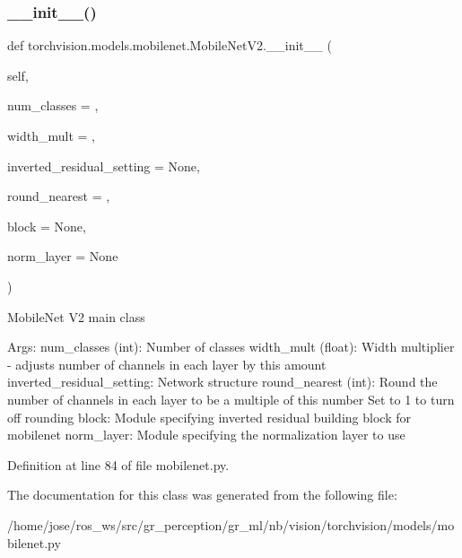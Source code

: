 \subsubsection{\texorpdfstring{\+\_\+\+\_\+init\+\_\+\+\_\+()}{\_\_init\_\_()}}
{\footnotesize\ttfamily def torchvision.\+models.\+mobilenet.\+Mobile\+Net\+V2.\+\_\+\+\_\+init\+\_\+\+\_\+ (\begin{DoxyParamCaption}\item[{}]{self,  }\item[{}]{num\+\_\+classes = {},  }\item[{}]{width\+\_\+mult = {},  }\item[{}]{inverted\+\_\+residual\+\_\+setting = {\ttfamily None},  }\item[{}]{round\+\_\+nearest = {},  }\item[{}]{block = {\ttfamily None},  }\item[{}]{norm\+\_\+layer = {\ttfamily None} }\end{DoxyParamCaption})}

\begin{DoxyVerb}MobileNet V2 main class

Args:
    num_classes (int): Number of classes
    width_mult (float): Width multiplier - adjusts number of channels in each layer by this amount
    inverted_residual_setting: Network structure
    round_nearest (int): Round the number of channels in each layer to be a multiple of this number
    Set to 1 to turn off rounding
    block: Module specifying inverted residual building block for mobilenet
    norm_layer: Module specifying the normalization layer to use\end{DoxyVerb}
 

Definition at line 84 of file mobilenet.\+py.



The documentation for this class was generated from the following file\+:\begin{DoxyCompactItemize}
\item 
/home/jose/ros\+\_\+ws/src/gr\+\_\+perception/gr\+\_\+ml/nb/vision/torchvision/models/mobilenet.\+py\end{DoxyCompactItemize}
